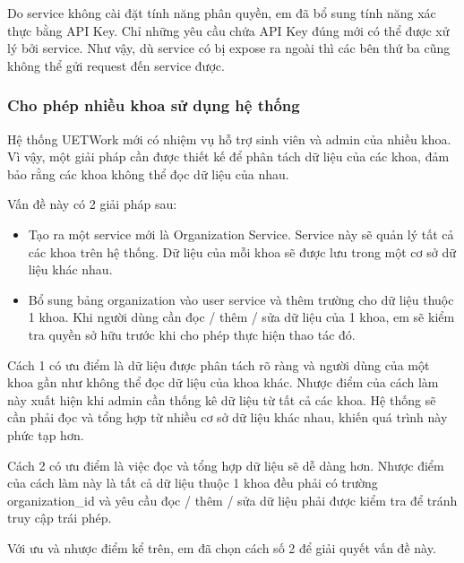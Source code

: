 \documentclass[./../main.tex]{subfiles}
\begin{document}
Do service không cài đặt tính năng phân quyền, em đã bổ sung tính năng
xác thực bằng API Key. Chỉ những yêu cầu chứa API Key đúng mới có thể
được xử lý bởi service. Như vậy, dù service có bị expose ra ngoài thì
các bên thứ ba cũng không thể gửi request đến service được.

\hypertarget{cho-phuxe9p-nhiux1ec1u-khoa-sux1eed-dux1ee5ng-hux1ec7-thux1ed1ng}{%
\subsubsection{Cho phép nhiều khoa sử dụng hệ
thống}\label{cho-phuxe9p-nhiux1ec1u-khoa-sux1eed-dux1ee5ng-hux1ec7-thux1ed1ng}}

Hệ thống UETWork mới có nhiệm vụ hỗ trợ sinh viên và admin của nhiều
khoa. Vì vậy, một giải pháp cần được thiết kế để phân tách dữ liệu của các
khoa, đảm bảo rằng các khoa không thể đọc dữ liệu của nhau.

Vấn đề này có 2 giải pháp sau:

\begin{itemize}
\item
  
  Tạo ra một service mới là Organization Service. Service này sẽ quản lý
  tất cả các khoa trên hệ thống. Dữ liệu của mỗi khoa sẽ được lưu trong
  một cơ sở dữ liệu khác nhau.
  
\item
  
  Bổ sung bảng organization vào user service và thêm trường
   cho dữ liệu thuộc 1 khoa. Khi người dùng cần đọc /
  thêm / sửa dữ liệu của 1 khoa, em sẽ kiểm tra quyền sở hữu trước khi
  cho phép thực hiện thao tác đó.
  
\end{itemize}

Cách 1 có ưu điểm là dữ liệu được phân tách rõ ràng và người dùng của
một khoa gần như không thể đọc dữ liệu của khoa khác. Nhược điểm của
cách làm này xuất hiện khi admin cần thống kê dữ liệu từ tất cả các
khoa. Hệ thống sẽ cần phải đọc và tổng hợp từ nhiều cơ sở dữ liệu khác
nhau, khiến quá trình này phức tạp hơn.

Cách 2 có ưu điểm là việc đọc và tổng hợp dữ liệu sẽ dễ dàng hơn. Nhược
điểm của cách làm này là tất cả dữ liệu thuộc 1 khoa đều phải có trường
organization\_id và yêu cầu đọc / thêm / sửa dữ liệu phải được kiểm tra
để tránh truy cập trái phép.

Với ưu và nhược điểm kể trên, em đã chọn cách số 2 để giải quyết vấn đề
này.
\end{document}
